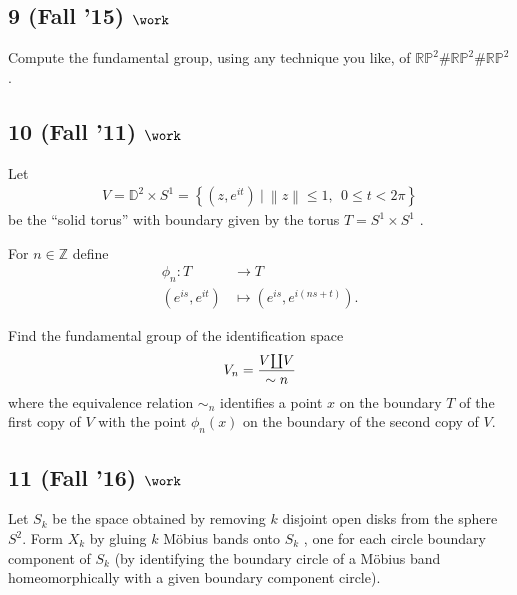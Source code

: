 \hypertarget{fall-15-work}{%
\subsection{\texorpdfstring{9 (Fall '15)
\(\work\)}{9 (Fall '15) \textbackslash work}}\label{fall-15-work}}

Compute the fundamental group, using any technique you like, of
\({\mathbb{RP}}^2 \#{\mathbb{RP}}^2 \#{\mathbb{RP}}^2\).

\hypertarget{fall-11-work}{%
\subsection{\texorpdfstring{10 (Fall '11)
\(\work\)}{10 (Fall '11) \textbackslash work}}\label{fall-11-work}}

Let
\begin{align*}
V = {\mathbb{D}}^2 \times S^1 = \left\{{ (z, e^{it}) {~\mathrel{\Big|}~}{\left\lVert {z} \right\rVert} \leq 1,~~ 0 \leq t < 2\pi}\right\}
\end{align*}
be the ``solid torus'' with boundary given by the torus
\(T = S^1 \times S^1\) .

For \(n \in {\mathbb{Z}}\) define
\begin{align*} \phi_n : T &\to T \\ (e^{is} , e^{it} ) &\mapsto (e^{is} , e^{i(ns+t)}) .\end{align*}

Find the fundamental group of the identification space
\begin{align*}
V_n = {V{\textstyle\coprod}V \over \sim n}
\end{align*}
where the equivalence relation \(\sim_n\) identifies a point \(x\) on
the boundary \(T\) of the first copy of \(V\) with the point
\(\phi_n (x)\) on the boundary of the second copy of \(V\).

\hypertarget{fall-16-work-3}{%
\subsection{\texorpdfstring{11 (Fall '16)
\(\work\)}{11 (Fall '16) \textbackslash work}}\label{fall-16-work-3}}

Let \(S_k\) be the space obtained by removing \(k\) disjoint open disks
from the sphere \(S^2\). Form \(X_k\) by gluing \(k\) Möbius bands onto
\(S_k\) , one for each circle boundary component of \(S_k\) (by
identifying the boundary circle of a Möbius band homeomorphically with a
given boundary component circle).

